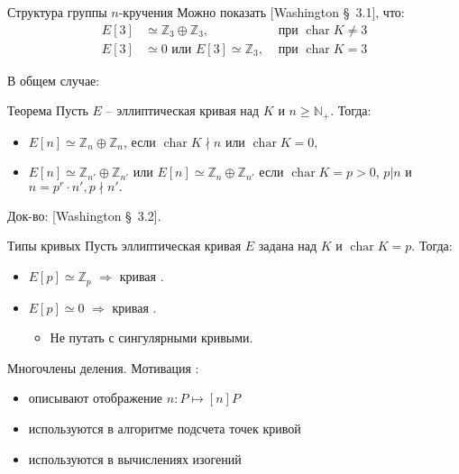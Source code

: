 \documentclass{beamer}
\begin{document}
\begin{frame}{Структура группы $n$-кручения}
Можно показать [Washington \S~3.1], что:
\begin{align*}
    E[3] &\simeq \mathbb{Z}_3 \oplus \mathbb{Z}_3, & {\text{ при }}\operatorname{char} K \ne 3 \\
    E[3] &\simeq 0 \text{ или } E[3] \simeq \mathbb{Z}_3, & {\text{ при }} \operatorname{char} K = 3
\end{align*}

В общем случае:

\begin{block}{Теорема}
    Пусть $E$ -- эллиптическая кривая над $K$ и $n \geqslant \mathbb{N}_+$. Тогда:
    \begin{itemize}
        \item $E[n] \simeq \mathbb{Z}_n \oplus \mathbb{Z}_n$, если $\operatorname{char} K \nmid n$ или $\operatorname{char} K = 0,$  
        \item $E[n] \simeq \mathbb{Z}_{n'} \oplus \mathbb{Z}_{n'}$ или $E[n] \simeq {\mathbb{Z}_n} \oplus \mathbb{Z}_{n'}$ если $\operatorname{char} K = p > 0$, $p|n$
        и $n = p^r \cdot n', p \nmid n'.$
    \end{itemize}
\end{block}
Док-во: [Washington \S~3.2].
\end{frame}

\begin{frame}{Типы кривых}
    Пусть эллиптическая кривая $E$ задана над $K$ и $\operatorname{char} K = p$. Тогда:
    \begin{itemize}
        \item $E[p] \simeq \mathbb{Z}_p$ $\Rightarrow$ кривая .
        \item $E[p] \simeq 0$ $\Rightarrow$ кривая .
        \begin{itemize}
            \item[\faExclamationTriangle] Не путать с сингулярными кривыми.
        \end{itemize}
    \end{itemize}
\end{frame}

\begin{frame}{Многочлены деления. Мотивация}
:
\begin{itemize}
    \item описывают отображение $n: P \mapsto [n] P$
    \item используются в алгоритме подсчета точек кривой
    \item используются в вычислениях изогений
\end{itemize}
\end{frame}
\end{document}

